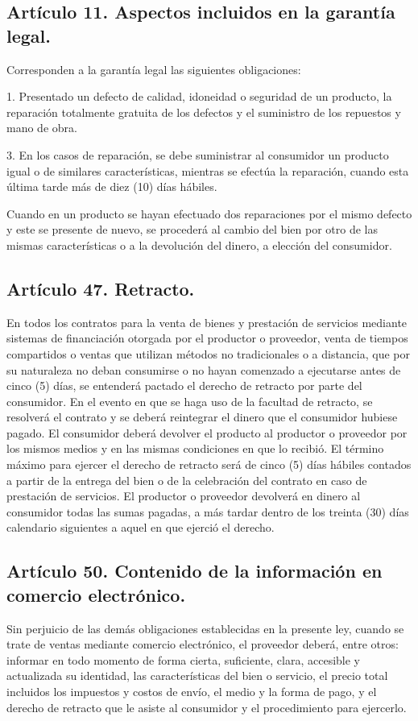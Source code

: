 \documentclass[11pt,a4paper]{article}
\begin{document}
\subsection*{Artículo 11. Aspectos incluidos en la garantía legal.}

Corresponden a la garantía legal las siguientes obligaciones:

1. Presentado un defecto de calidad, idoneidad o seguridad de un producto, la reparación totalmente gratuita de los defectos y el suministro de los repuestos y mano de obra.

3. En los casos de reparación, se debe suministrar al consumidor un producto igual o de similares características, mientras se efectúa la reparación, cuando esta última tarde más de diez (10) días hábiles.

Cuando en un producto se hayan efectuado dos reparaciones por el mismo defecto y este se presente de nuevo, se procederá al cambio del bien por otro de las mismas características o a la devolución del dinero, a elección del consumidor.

\subsection*{Artículo 47. Retracto.}

En todos los contratos para la venta de bienes y prestación de servicios mediante sistemas de financiación otorgada por el productor o proveedor, venta de tiempos compartidos o ventas que utilizan métodos no tradicionales o a distancia, que por su naturaleza no deban consumirse o no hayan comenzado a ejecutarse antes de cinco (5) días, se entenderá pactado el derecho de retracto por parte del consumidor. En el evento en que se haga uso de la facultad de retracto, se resolverá el contrato y se deberá reintegrar el dinero que el consumidor hubiese pagado. El consumidor deberá devolver el producto al productor o proveedor por los mismos medios y en las mismas condiciones en que lo recibió. El término máximo para ejercer el derecho de retracto será de cinco (5) días hábiles contados a partir de la entrega del bien o de la celebración del contrato en caso de prestación de servicios. El productor o proveedor devolverá en dinero al consumidor todas las sumas pagadas, a más tardar dentro de los treinta (30) días calendario siguientes a aquel en que ejerció el derecho.

\subsection*{Artículo 50. Contenido de la información en comercio electrónico.}

Sin perjuicio de las demás obligaciones establecidas en la presente ley, cuando se trate de ventas mediante comercio electrónico, el proveedor deberá, entre otros: informar en todo momento de forma cierta, suficiente, clara, accesible y actualizada su identidad, las características del bien o servicio, el precio total incluidos los impuestos y costos de envío, el medio y la forma de pago, y el derecho de retracto que le asiste al consumidor y el procedimiento para ejercerlo.
\end{document}
